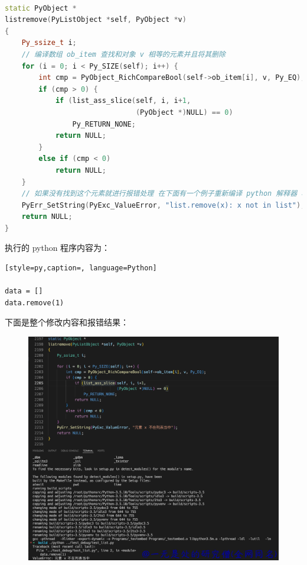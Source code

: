 \begin{lstlisting}[style=cpp,caption=cpython/objects/list.c, language=C++]

static PyObject *
listremove(PyListObject *self, PyObject *v)
{
    Py_ssize_t i;
  	// 编译数组 ob_item 查找和对象 v 相等的元素并且将其删除
    for (i = 0; i < Py_SIZE(self); i++) {
        int cmp = PyObject_RichCompareBool(self->ob_item[i], v, Py_EQ);
        if (cmp > 0) {
            if (list_ass_slice(self, i, i+1,
                               (PyObject *)NULL) == 0)
                Py_RETURN_NONE;
            return NULL;
        }
        else if (cmp < 0)
            return NULL;
    }
  	// 如果没有找到这个元素就进行报错处理 在下面有一个例子重新编译 python 解释器 将这个错误内容修改的例子
    PyErr_SetString(PyExc_ValueError, "list.remove(x): x not in list");
    return NULL;
}
\end{lstlisting}
执行的 python 程序内容为：
\begin{lstlisting}[style=py,caption=, language=Python]

data = []
data.remove(1)
\end{lstlisting}
下面是整个修改内容和报错结果：

    \begin{figure}[h]
        \centering
            \includegraphics[scale=.2]{images/06-list.png}
            \caption{ }
        \label{fig:my_label}
    \end{figure}
    
